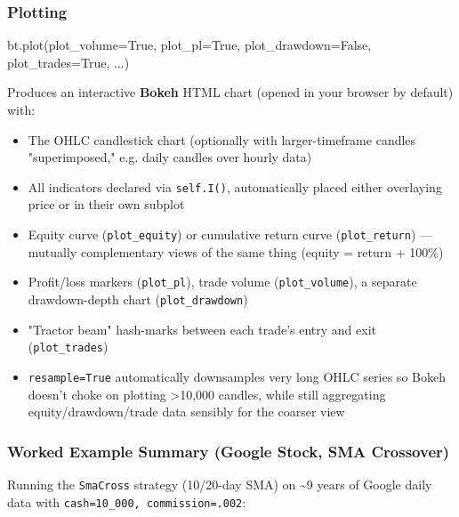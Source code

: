 \documentclass[12pt,openany]{book}
\theoremstyle{definition}
\theoremstyle{remark}
\begin{document}
\subsubsection{Plotting}

\begin{python}
bt.plot(plot_volume=True, plot_pl=True, plot_drawdown=False, plot_trades=True, ...)
\end{python}

Produces an interactive \textbf{Bokeh} HTML chart (opened in your browser by default) with:

\begin{itemize}
\item 
The OHLC candlestick chart (optionally with larger-timeframe candles "superimposed," e.g. daily candles over hourly data)

\item 
All indicators declared via \texttt{self.I()}, automatically placed either overlaying price or in their own subplot

\item 
Equity curve (\texttt{plot\_equity}) or cumulative return curve (\texttt{plot\_return}) — mutually complementary views of the same thing (equity = return + 100\%)

\item 
Profit/loss markers (\texttt{plot\_pl}), trade volume (\texttt{plot\_volume}), a separate drawdown-depth chart (\texttt{plot\_drawdown})

\item 
"Tractor beam" hash-marks between each trade's entry and exit (\texttt{plot\_trades})

\item 
\texttt{resample=True} automatically downsamples very long OHLC series so Bokeh doesn't choke on plotting >10,000 candles, while still aggregating equity/drawdown/trade data sensibly for the coarser view

\end{itemize}
\subsubsection{Worked Example Summary (Google Stock, SMA Crossover)}

Running the \texttt{SmaCross} strategy (10/20-day SMA) on \textasciitilde{}9 years of Google daily data with \texttt{cash=10\_000, commission=.002}:
\end{document}
